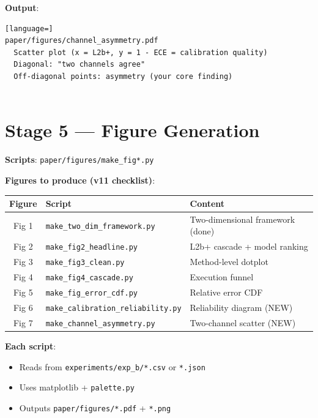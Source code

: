 \documentclass[11pt,a4paper]{article}
\begin{document}
{{{{{{{{{{\textbf{Output}:

\begin{lstlisting}[language=]
paper/figures/channel_asymmetry.pdf
  Scatter plot (x = L2b+, y = 1 - ECE = calibration quality)
  Diagonal: "two channels agree"
  Off-diagonal points: asymmetry (your core finding)
  
\end{lstlisting}

\newpage

\section{Stage 5 — Figure Generation}

\textbf{Scripts}: \texttt{paper/figures/make\_fig*.py}

\textbf{Figures to produce (v11 checklist)}:

\begin{center}
\begin{tabular}{|c|l|l|}
\hline
\textbf{Figure} & \textbf{Script} & \textbf{Content} \\
\hline
Fig 1 & \texttt{make\_two\_dim\_framework.py}   & Two-dimensional framework (done) \\
Fig 2 & \texttt{make\_fig2\_headline.py}        & L2b+ cascade + model ranking \\
Fig 3 & \texttt{make\_fig3\_clean.py}           & Method-level dotplot \\
Fig 4 & \texttt{make\_fig4\_cascade.py}         & Execution funnel \\
Fig 5 & \texttt{make\_fig\_error\_cdf.py}       & Relative error CDF \\
Fig 6 & \texttt{make\_calibration\_reliability.py} & Reliability diagram (NEW) \\
Fig 7 & \texttt{make\_channel\_asymmetry.py}    & Two-channel scatter (NEW) \\
\hline
\end{tabular}
\end{center}

\textbf{Each script}:
\begin{itemize}[leftmargin=1.5em]
\item Reads from \texttt{experiments/exp\_b/*.csv} or \texttt{*.json}
\item Uses matplotlib + \texttt{palette.py}
\item Outputs \texttt{paper/figures/*.pdf} + \texttt{*.png}
\end{itemize}

}}}}}}}}}}
\end{document}
